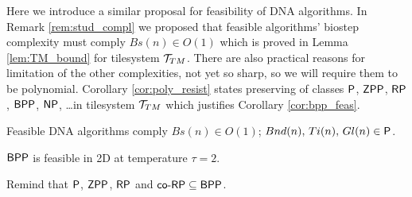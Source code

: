 	Here we introduce a similar proposal for feasibility of DNA algorithms. In Remark \ref{rem:stud_compl} we proposed that feasible algorithms' biostep complexity must comply $Bs(n)\in O(1)$ which is proved in Lemma \ref{lem:TM_bound} for tilesystem ${\cal T}_{TM}$. There are also practical reasons for limitation of the other complexities, not yet so sharp, so we will require them to be polynomial. Corollary \ref{cor:poly_resist} states preserving of classes $\P$, $\ZPP$, $\RP$, $\BPP$, $\NP$, \ldots in tilesystem ${\cal T}_{TM}$ which justifies Corollary \ref{cor:bpp_feas}.
	
	\begin{thesis}   %
		Feasible DNA algorithms comply $Bs(n)\in O(1)$; $Bnd(n),\,Ti(n),\,Gl(n)\in \P$.   %
	\end{thesis}
	
	\begin{cor}
	\label{cor:bpp_feas}
		$\BPP$ is feasible in 2D at temperature $\tau=2$.
	\end{cor}
	
	\begin{note}
		Remind that $\P$, $\ZPP$, $\RP$ and $\coRP \subseteq \BPP$.
	\end{note}
	
	
	
	
	
	
	

